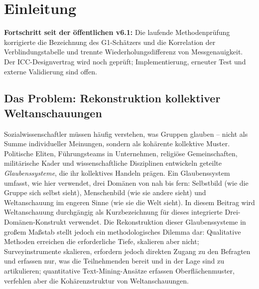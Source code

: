 \documentclass[11pt,a4paper]{article}
\begin{document}
\clearpage
{}
\setcounter{page}{2}
{}
\begingroup
\small
{}
\setlength{\parskip}{0pt}
\setcounter{tocdepth}{2}
\tableofcontents
\endgroup
\clearpage
{}
\setcounter{page}{1}
\hypersetup{pageanchor=true}

\section{Einleitung}
\label{sec:introduction}

\noindent\textbf{Fortschritt seit der öffentlichen v6.1:} Die laufende Methodenprüfung korrigierte die Bezeichnung des G1-Schätzers und die Korrelation der Verblindungstabelle und trennte Wiederholungsdifferenz von Messgenauigkeit. Der ICC-Designvertrag wird noch geprüft; Implementierung, erneuter Test und externe Validierung sind offen.

\subsection{Das Problem: Rekonstruktion kollektiver Weltanschauungen}
\label{sec:intro:problem}

Sozialwissenschaftler müssen häufig verstehen, was Gruppen glauben -- nicht als Summe individueller Meinungen, sondern als kohärente kollektive Muster. Politische Eliten, Führungsteams in Unternehmen, religiöse Gemeinschaften, militärische Kader und wissenschaftliche Disziplinen entwickeln geteilte \emph{Glaubenssysteme}, die ihr kollektives Handeln prägen. Ein Glaubenssystem umfasst, wie hier verwendet, drei Domänen von nah bis fern: Selbstbild (wie die Gruppe sich selbst sieht), Menschenbild (wie sie andere sieht) und Weltanschauung im engeren Sinne (wie sie die Welt sieht). In diesem Beitrag wird \glqq{}Weltanschauung\grqq{} durchgängig als Kurzbezeichnung für dieses integrierte Drei-Domänen-Konstrukt verwendet. Die Rekonstruktion dieser Glaubenssysteme in großem Maßstab stellt jedoch ein methodologisches Dilemma dar: Qualitative Methoden erreichen die erforderliche Tiefe, skalieren aber nicht; Surveyinstrumente skalieren, erfordern jedoch direkten Zugang zu den Befragten und erfassen nur, was die Teilnehmenden bereit und in der Lage sind zu artikulieren; quantitative Text-Mining-Ansätze erfassen Oberflächenmuster, verfehlen aber die Kohärenzstruktur von Weltanschauungen.
\end{document}
